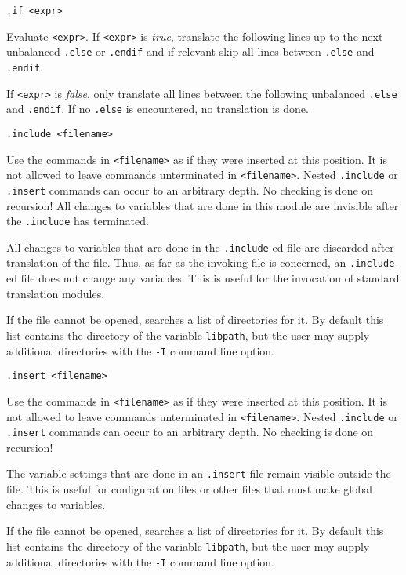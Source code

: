 \begin{verbatim}
.if <expr>
\end{verbatim}
\begin{desc}
Evaluate {\tt <expr>}.
If {\tt <expr>} is {\it true},
translate the following lines up to the next unbalanced
{\tt .else} or {\tt .endif}
and if relevant skip all lines between {\tt .else} and {\tt .endif}.

If {\tt <expr>} is {\it false},
only translate all lines between the following unbalanced
{\tt .else} and {\tt .endif}.
If no {\tt .else} is encountered, no translation is done.
\end{desc}
\begin{verbatim}
.include <filename>
\end{verbatim}
\begin{desc}
Use the {\Tm} commands in {\tt <filename>} as if they were inserted at
this position.
It is not allowed to leave commands unterminated in {\tt <filename>}.
Nested {\tt .include} or {\tt .insert} commands can occur to an arbitrary depth.
No checking is done on recursion!
All changes to variables that are done in this module are invisible after
the {\tt .include} has terminated.
\par
All changes to variables that are done in the {\tt .include}-ed file
are discarded after translation of the file. Thus, as far as the invoking
file is concerned, an {\tt .include}-ed file does not change any variables.
This is useful for the invocation of standard translation modules.
\par
If the file cannot be opened, {\Tm} searches a list of directories for it.
By default this list contains the directory of the variable
\verb+libpath+, but the user may supply additional directories with the
\verb+-I+ command line option.
\end{desc}
\begin{verbatim}
.insert <filename>
\end{verbatim}
\begin{desc}
Use the {\Tm} commands in {\tt <filename>} as if they were inserted at
this position.
It is not allowed to leave commands unterminated in {\tt <filename>}.
Nested {\tt .include} or {\tt .insert}
commands can occur to an arbitrary depth.
No checking is done on recursion!
\par
The variable settings that are done in an {\tt .insert}
file remain visible outside the file.
This is useful for configuration files or other files that
must make global changes to variables.
\par
If the file cannot be opened, {\Tm} searches a list of directories for it.
By default this list contains the directory of the variable
\verb+libpath+, but the user may supply additional directories with the
\verb+-I+ command line option.
\end{desc}
